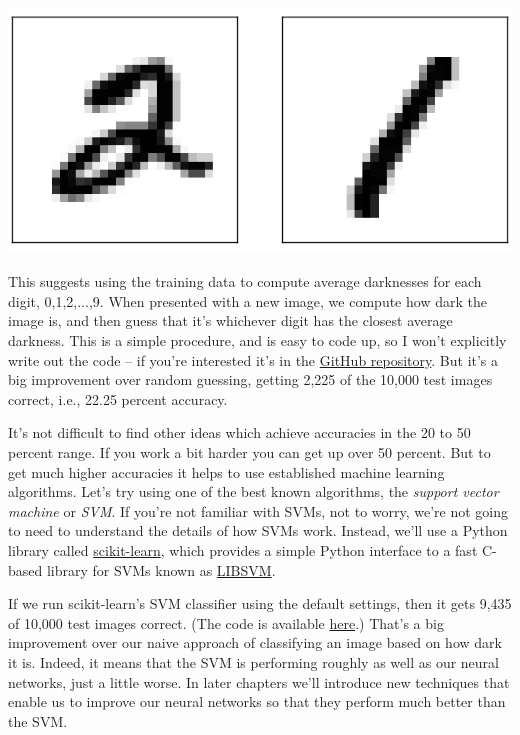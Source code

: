 \documentclass[a4paper,twoside,10pt]{book}
\begin{document}
\begin{center}
	\includegraphics[scale=0.18]{./figures/ch1/mnist_2_and_1}
\end{center}
This suggests using the training data to compute average darknesses for each digit, 0,1,2,$\ldots$,9. When presented with a new image, we compute how dark the image is, and then guess that it's whichever digit has the closest average darkness. This is a simple procedure, and is easy to code up, so I won't explicitly write out the code -- if you're interested it's in the \href{https://github.com/mnielsen/neural-networks-and-deep-learning/blob/master/src/mnist_average_darkness.py}{GitHub repository}. But it's a big improvement over random guessing, getting 2,225 of the 10,000 test images correct, i.e., 22.25 percent accuracy.


It's not difficult to find other ideas which achieve accuracies in the 20 to 50 percent range. If you work a bit harder you can get up over 50 percent. But to get much higher accuracies it helps to use established machine learning algorithms. Let's try using one of the best known algorithms, the \textit{support vector machine} or \textit{SVM}. If you're not familiar with SVMs, not to worry, we're not going to need to understand the details of how SVMs work. Instead, we'll use a Python library called \href{http://scikit-learn.org/stable/}{scikit-learn}, which provides a simple Python interface to a fast C-based library for SVMs known as \href{http://www.csie.ntu.edu.tw/~cjlin/libsvm/}{LIBSVM}.

If we run scikit-learn's SVM classifier using the default settings, then it gets 9,435 of 10,000 test images correct. (The code is available \href{https://github.com/mnielsen/neural-networks-and-deep-learning/blob/master/src/mnist_svm.py}{here}.) That's a big improvement over our naive approach of classifying an image based on how dark it is. Indeed, it means that the SVM is performing roughly as well as our neural networks, just a little worse. In later chapters we'll introduce new techniques that enable us to improve our neural networks so that they perform much better than the SVM.
\end{document}
